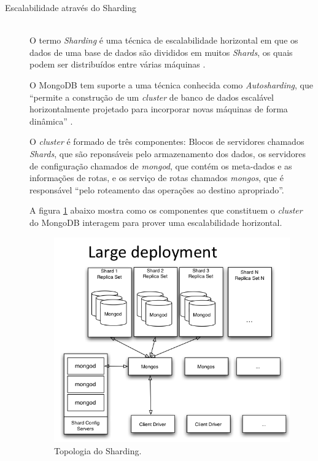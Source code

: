 \begin{description}
\item[Escalabilidade através do Sharding] \hfill \\ 
 O termo \textit{Sharding} é uma técnica de escalabilidade horizontal em que os dados de uma base de dados são divididos em muitos \textit{Shards}, os quais podem ser distribuídos entre várias máquinas \cite{AnalysisNoSQL}.

O MongoDB tem suporte a uma técnica conhecida como \textit{Autosharding}, que ``permite a construção de um \textit{cluster} de banco de dados escalável horizontalmente projetado para incorporar novas máquinas de forma dinâmica'' \cite{BdNoSQLxSGBDs}.

O \textit{cluster} é formado de três componentes: Blocos de servidores chamados \textit{Shards}, que são reponsáveis pelo armazenamento dos dados, os servidores de configuração chamados de \textit{mongod}, que contém os meta-dados e as informações de rotas, e os serviço de rotas chamados \textit{mongos}, que é responsável ``pelo roteamento das operações ao destino apropriado''\cite{BdNoSQLxSGBDs}.

A figura \ref{fig: Topologia do Sharding} \cite{MongoPy} abaixo mostra como os componentes que constituem o \textit{cluster} do MongoDB interagem para prover uma escalabilidade horizontal.  
\begin{figure}[!ht]
\centering
\includegraphics[scale=0.7]{images/1sharding_topology.png}
\caption{Topologia do Sharding.}
\label{fig: Topologia do Sharding}
\end{figure}


\end{description}
